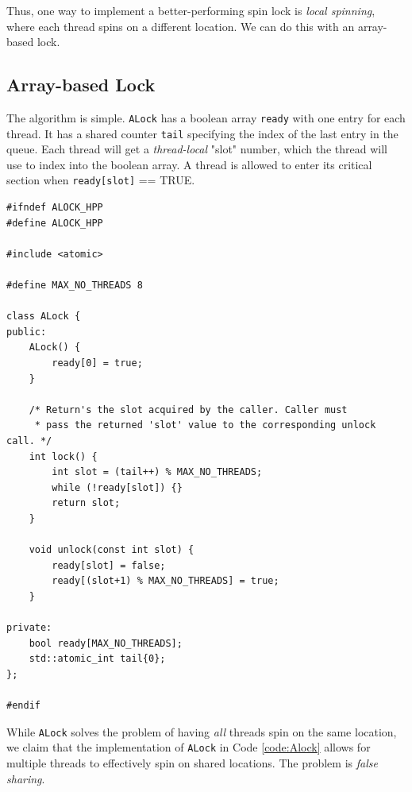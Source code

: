 Thus, one way to implement a better-performing spin lock is \textit{local spinning}, where each thread spins on a different location. We can do this with an array-based lock.

\subsection{Array-based Lock}
The algorithm is simple. \verb|ALock| has a boolean array \verb|ready| with one entry for each thread. It has a shared counter \verb|tail| specifying the index of the last entry in the queue. Each thread will get a \textit{thread-local} "slot" number, which the thread will use to index into the boolean array. A thread is allowed to enter its critical section when \verb|ready[slot]| == TRUE.

\makebox[\linewidth]{\rule{17cm}{0.4pt}}
{\centering \label{code:Alock}
\begin{verbatim}
#ifndef ALOCK_HPP
#define ALOCK_HPP

#include <atomic>

#define MAX_NO_THREADS 8

class ALock {
public:
    ALock() {
        ready[0] = true;
    }

    /* Return's the slot acquired by the caller. Caller must
     * pass the returned 'slot' value to the corresponding unlock call. */
    int lock() {
        int slot = (tail++) % MAX_NO_THREADS;
        while (!ready[slot]) {}
        return slot;
    }

    void unlock(const int slot) {
        ready[slot] = false;
        ready[(slot+1) % MAX_NO_THREADS] = true;
    }

private:
    bool ready[MAX_NO_THREADS];
    std::atomic_int tail{0};
};

#endif
\end{verbatim}
\makebox[\linewidth]{\rule{17cm}{0.4pt}}
}

While \verb|ALock| solves the problem of having \textit{all} threads spin on the same location, we claim that the implementation of \verb|ALock| in Code \ref{code:Alock} allows for multiple threads to effectively spin on shared locations. The problem is \textit{false sharing}.

